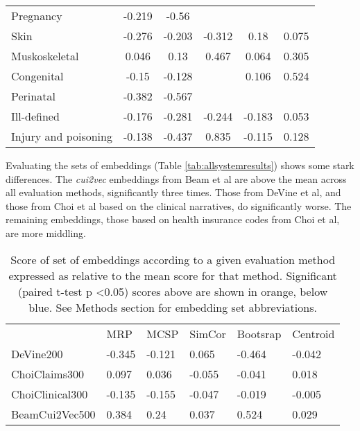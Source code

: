 \documentclass[10pt]{article}
\def\blu#1{{\color{blu}#1}}
\def\ora#1{{\color{ora}#1}}
\begin{document}
\begin{table*}[]
\begin{tabular}{lccccc}
		Pregnancy            & -0.219                        & \blu{-0.56}  &                               &                              &                              \\
		Skin                 & \blu{-0.276} & -0.203                        & -0.312                        & 0.18                         & 0.075                        \\
		Muskoskeletal        & 0.046                         & 0.13                          & \ora{0.467}  & 0.064                        & \ora{0.305} \\
		Congenital           & -0.15                         & -0.128                        &                               & 0.106                        & \ora{0.524} \\
		Perinatal            & -0.382                        & \blu{-0.567} &                               &                              &                              \\
		Ill-defined          & -0.176                        & -0.281                        & -0.244                        & -0.183                       & 0.053                        \\
		Injury and poisoning & -0.138                        & \blu{-0.437} & \ora{0.835}  & -0.115                       & 0.128                       
	\end{tabular}
\end{table*}

 Evaluating the sets of embeddings (Table \ref{tab:allsystemresults}) shows some stark differences. The \emph{cui2vec} embeddings from Beam et al are above the mean across all evaluation methods, significantly three times. Those from DeVine et al, and those from Choi et al based on the clinical narratives, do significantly worse. The remaining embeddings, those based on health insurance codes from Choi et al, are more middling. 


\begin{table*}[]
	\caption{Score of set of embeddings according to a given evaluation method expressed as relative to the mean score for that method. Significant (paired t-test p \textless 0.05) scores above are shown in orange, below blue. See Methods section for embedding set abbreviations.}
	\label{tab:allembedresults}
	\begin{tabular}{llllll}
			            &MRP	        &MCSP	           &SimCor	    &Bootsrap	  &Centroid\\
		DeVine200       &\blu{-0.345}   &\blu{-0.121}	   &0.065	    &\blu{-0.464} &	-0.042 \\
		ChoiClaims300   &\ora{0.097}	&0.036	           &-0.055	    &-0.041	      &0.018   \\
		ChoiClinical300	&\blu{-0.135}	&\blu{-0.155}	   &-0.047	    &-0.019	      &-0.005  \\
		BeamCui2Vec500	&\ora{0.384}	&\ora{0.24}	       &0.037       &\ora{0.524}  &0.029   \\
	\end{tabular}
\end{table*}
\end{document}
